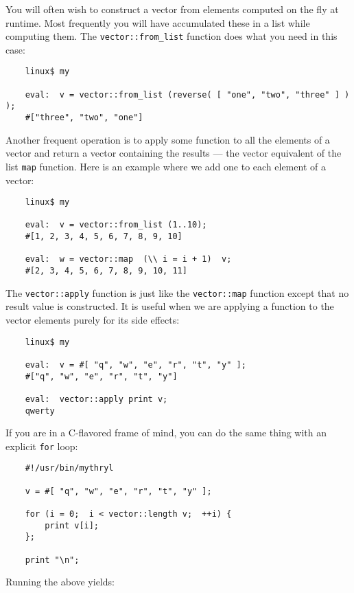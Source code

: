 You will often wish to construct a vector from elements computed on 
the fly at runtime.  Most frequently you will have accumulated these 
in a list while computing them.  The {\tt vector::from\_list} function 
does what you need in this case:

\begin{verbatim}
    linux$ my

    eval:  v = vector::from_list (reverse( [ "one", "two", "three" ] ) );
    #["three", "two", "one"]
\end{verbatim}

Another frequent operation is to apply some function to all the elements 
of a vector and return a vector containing the results --- the vector 
equivalent of the list {\tt map} function.  Here is an example where we 
add one to each element of a vector:

\begin{verbatim}
    linux$ my

    eval:  v = vector::from_list (1..10);
    #[1, 2, 3, 4, 5, 6, 7, 8, 9, 10]

    eval:  w = vector::map  (\\ i = i + 1)  v;
    #[2, 3, 4, 5, 6, 7, 8, 9, 10, 11]
\end{verbatim}

The {\tt vector::apply} function is just like the {\tt vector::map} function 
except that no result value is constructed.  It is useful when we are applying 
a function to the vector elements purely for its side effects:

\begin{verbatim}
    linux$ my

    eval:  v = #[ "q", "w", "e", "r", "t", "y" ];
    #["q", "w", "e", "r", "t", "y"]

    eval:  vector::apply print v;
    qwerty
\end{verbatim}

If you are in a C-flavored frame of mind, you can do the same 
thing with an explicit {\tt for} loop:

\begin{verbatim}
    #!/usr/bin/mythryl

    v = #[ "q", "w", "e", "r", "t", "y" ];

    for (i = 0;  i < vector::length v;  ++i) {
        print v[i];
    };

    print "\n";
\end{verbatim}

Running the above yields:

